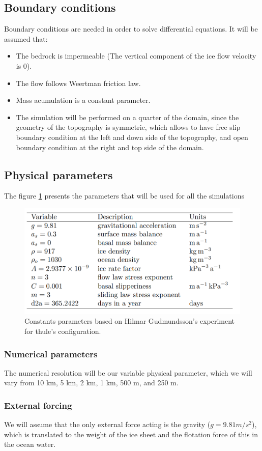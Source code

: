 \documentclass[a4paper,12pt]{article}
\begin{document}
\subsection{Boundary conditions}
Boundary conditions are needed in order to solve differential equations. It will be assumed that:
\begin{itemize}
	\item The bedrock is impermeable (The vertical component of the ice flow velocity is 0). 
	\item The flow follows Weertman friction law.
	\item Mass acumulation is a constant parameter.
	\item The simulation will be performed on a quarter of the domain, since the geometry of the topography is symmetric, which allows to have free slip boundary condition at the left and down side of the topography, and open boundary condition at the right and top side of the domain. 
\end{itemize}
\subsection{Physical parameters}
The figure \ref{Constants_parameters} presents the parameters that will be used for all the simulations
\begin{figure}[!h]
	\centering
	\includegraphics[width=0.7\linewidth]{../fig/Constants_parameters}
	\caption{Constants parameters based on Hilmar Gudmundsson's experiment for thule's configuration.}
	\label{Constants_parameters}
\end{figure}
\subsubsection{Numerical parameters}
The numerical resolution will be our variable physical parameter, which we will vary from 10 km, 5 km, 2 km, 1 km, 500 m, and 250 m. 
\subsubsection{External forcing}
We will assume that the only external force acting is the gravity ($g=9.81 m/s^2$), which is translated to the weight of the ice sheet and the flotation force of this in the ocean water.
\end{document}
